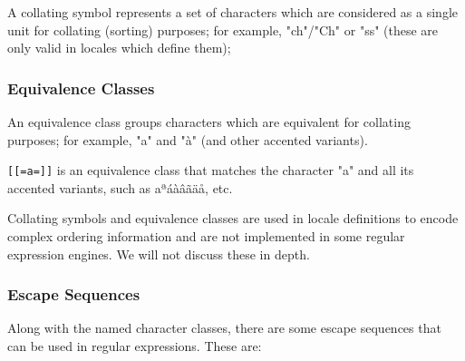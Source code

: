A collating symbol represents a set of characters which are considered as a single unit for collating (sorting) purposes; for example, "ch"/"Ch" or "ss" (these are only valid in locales which define them);

\subsubsection{Equivalence Classes}

An equivalence class groups characters which are equivalent for collating purposes; for example, "a" and "à" (and other accented variants).

\lstinline|[[=a=]]| is an equivalence class that matches the character "a" and all its accented variants, such as aªáàâãäå, etc.

Collating symbols and equivalence classes are used in locale definitions to encode complex ordering information and are not implemented in some regular expression engines. We will not discuss these in depth.

\subsubsection{Escape Sequences}

Along with the named character classes, there are some escape sequences that can be used in regular expressions. These are:

